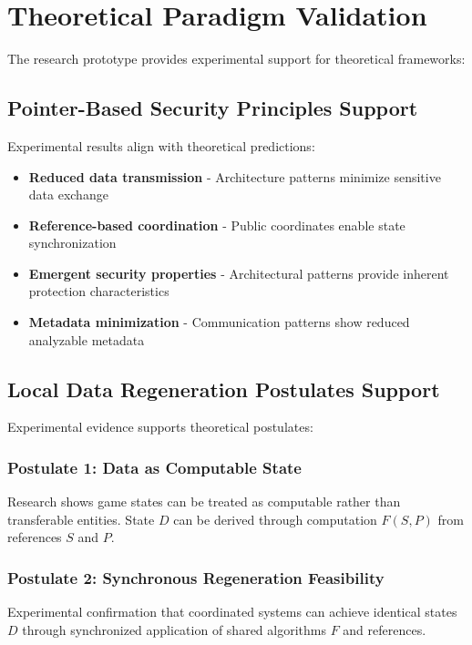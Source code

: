 \documentclass[14pt, a4paper]{extarticle}
\begin{document}
\section{Theoretical Paradigm Validation}

The research prototype provides experimental support for theoretical frameworks:

\subsection{Pointer-Based Security Principles Support}

Experimental results align with theoretical predictions:
\begin{itemize}
    \item \textbf{Reduced data transmission} - Architecture patterns minimize sensitive data exchange
    \item \textbf{Reference-based coordination} - Public coordinates enable state synchronization
    \item \textbf{Emergent security properties} - Architectural patterns provide inherent protection characteristics
    \item \textbf{Metadata minimization} - Communication patterns show reduced analyzable metadata
\end{itemize}

\subsection{Local Data Regeneration Postulates Support}

Experimental evidence supports theoretical postulates:

\subsubsection{Postulate 1: Data as Computable State}
Research shows game states can be treated as computable rather than transferable entities. State $D$ can be derived through computation $F(S, P)$ from references $S$ and $P$.

\subsubsection{Postulate 2: Synchronous Regeneration Feasibility}
Experimental confirmation that coordinated systems can achieve identical states $D$ through synchronized application of shared algorithms $F$ and references.
\end{document}
